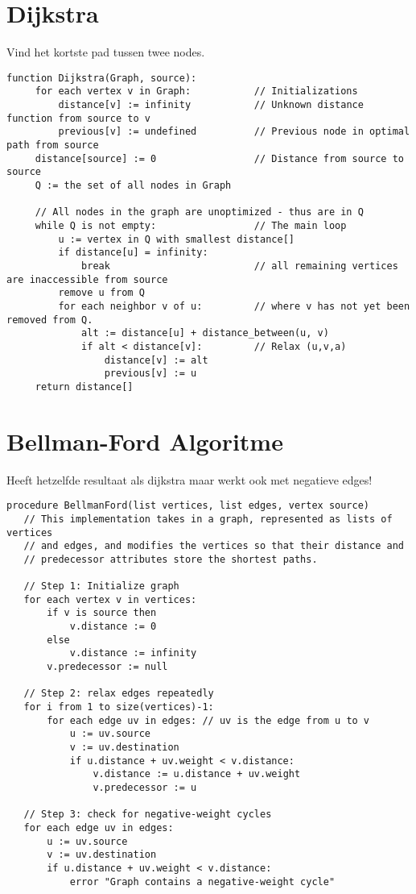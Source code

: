 \documentclass[a4paper,10pt,oneside]{report}
\begin{document}
\section{Dijkstra}
Vind het kortste pad tussen twee nodes.
\begin{verbatim}
function Dijkstra(Graph, source):
     for each vertex v in Graph:           // Initializations
         distance[v] := infinity           // Unknown distance function from source to v
         previous[v] := undefined          // Previous node in optimal path from source
     distance[source] := 0                 // Distance from source to source
     Q := the set of all nodes in Graph

     // All nodes in the graph are unoptimized - thus are in Q
     while Q is not empty:                 // The main loop
         u := vertex in Q with smallest distance[]
         if distance[u] = infinity:
             break                         // all remaining vertices are inaccessible from source
         remove u from Q
         for each neighbor v of u:         // where v has not yet been removed from Q.
             alt := distance[u] + distance_between(u, v) 
             if alt < distance[v]:         // Relax (u,v,a)
                 distance[v] := alt
                 previous[v] := u
     return distance[]
\end{verbatim}

\section{Bellman-Ford Algoritme}
Heeft hetzelfde resultaat als dijkstra maar werkt ook met negatieve edges!
\begin{verbatim}
procedure BellmanFord(list vertices, list edges, vertex source)
   // This implementation takes in a graph, represented as lists of vertices
   // and edges, and modifies the vertices so that their distance and
   // predecessor attributes store the shortest paths.

   // Step 1: Initialize graph
   for each vertex v in vertices:
       if v is source then
           v.distance := 0
       else
           v.distance := infinity
       v.predecessor := null
   
   // Step 2: relax edges repeatedly
   for i from 1 to size(vertices)-1:       
       for each edge uv in edges: // uv is the edge from u to v
           u := uv.source
           v := uv.destination             
           if u.distance + uv.weight < v.distance:
               v.distance := u.distance + uv.weight
               v.predecessor := u

   // Step 3: check for negative-weight cycles
   for each edge uv in edges:
       u := uv.source
       v := uv.destination
       if u.distance + uv.weight < v.distance:
           error "Graph contains a negative-weight cycle"
\end{verbatim}
\end{document}
